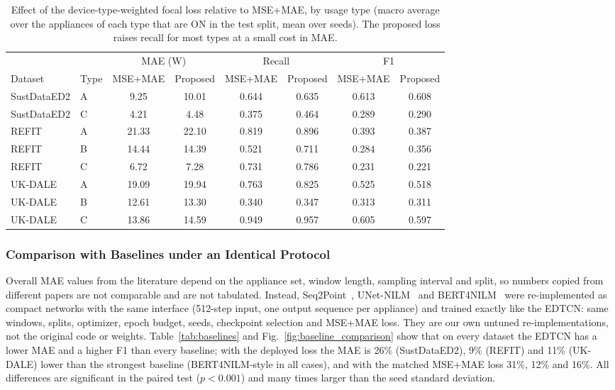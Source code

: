\documentclass[fleqn,10pt]{wlscirep}
\begin{document}
\begin{table}[!t]
\centering
\caption{Effect of the device-type-weighted focal loss relative to MSE+MAE, by usage type (macro average over the appliances of each type that are ON in the test split, mean over seeds). The proposed loss raises recall for most types at a small cost in MAE.}
\label{tab:loss_by_type}
\footnotesize
\begin{tabular}{@{}llcccccc@{}}
\toprule
 & & \multicolumn{2}{c}{MAE (W)} & \multicolumn{2}{c}{Recall} & \multicolumn{2}{c}{F1} \\
\cmidrule(lr){3-4}\cmidrule(lr){5-6}\cmidrule(lr){7-8}
Dataset & Type & MSE+MAE & Proposed & MSE+MAE & Proposed & MSE+MAE & Proposed \\
\midrule
SustDataED2 & A & 9.25 & 10.01 & 0.644 & 0.635 & 0.613 & 0.608 \\
SustDataED2 & C & 4.21 & 4.48 & 0.375 & 0.464 & 0.289 & 0.290 \\
REFIT & A & 21.33 & 22.10 & 0.819 & 0.896 & 0.393 & 0.387 \\
REFIT & B & 14.44 & 14.39 & 0.521 & 0.711 & 0.284 & 0.356 \\
REFIT & C & 6.72 & 7.28 & 0.731 & 0.786 & 0.231 & 0.221 \\
UK-DALE & A & 19.09 & 19.94 & 0.763 & 0.825 & 0.525 & 0.518 \\
UK-DALE & B & 12.61 & 13.30 & 0.340 & 0.347 & 0.313 & 0.311 \\
UK-DALE & C & 13.86 & 14.59 & 0.949 & 0.957 & 0.605 & 0.597 \\
\bottomrule
\end{tabular}
\end{table}

\subsubsection{Comparison with Baselines under an Identical Protocol}
\label{subsubsec:sota_comparison}

Overall MAE values from the literature depend on the appliance set, window length, sampling interval and split, so numbers copied from different papers are not comparable and are not tabulated. Instead, Seq2Point~\cite{Kelly2018}, UNet-NILM~\cite{Bonfigli2019} and BERT4NILM~\cite{Yue2020} were re-implemented as compact networks with the same interface (512-step input, one output sequence per appliance) and trained exactly like the EDTCN: same windows, splits, optimizer, epoch budget, seeds, checkpoint selection and MSE+MAE loss. They are our own untuned re-implementations, not the original code or weights. Table~\ref{tab:baselines} and Fig.~\ref{fig:baseline_comparison} show that on every dataset the EDTCN has a lower MAE and a higher F1 than every baseline; with the deployed loss the MAE is 26\% (SustDataED2), 9\% (REFIT) and 11\% (UK-DALE) lower than the strongest baseline (BERT4NILM-style in all cases), and with the matched MSE+MAE loss 31\%, 12\% and 16\%. All differences are significant in the paired test ($p<0.001$) and many times larger than the seed standard deviation.
\end{document}
